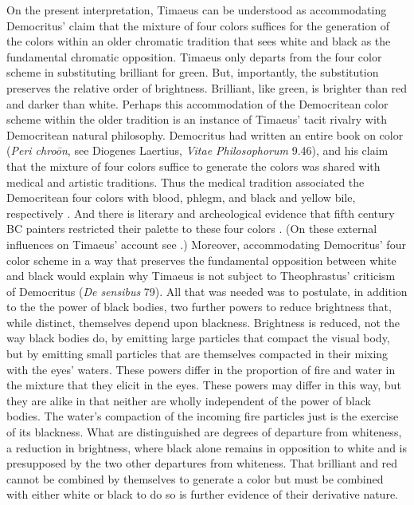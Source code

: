On the present interpretation, Timaeus can be understood as accommodating Democritus' claim that the mixture of four colors suffices for the generation of the colors within an older chromatic tradition that sees white and black as the fundamental chromatic opposition. Timaeus only departs from the four color scheme in substituting brilliant for green. But, importantly, the substitution preserves the relative order of brightness. Brilliant, like green, is brighter than red and darker than white. Perhaps this accommodation of the Democritean color scheme within the older tradition is an instance of Timaeus' tacit rivalry with Democritean natural philosophy. Democritus had written an entire book on color (\emph{Peri chroōn}, see Diogenes Laertius, \emph{Vitae Philosophorum} 9.46), and his claim that the mixture of four colors suffice to generate the colors was shared with medical and artistic traditions. Thus the medical tradition associated the Democritean four colors with blood, phlegm, and black and yellow bile, respectively \cite[]{Longrigg:1963tt}. And there is literary and archeological evidence that fifth century BC painters restricted their palette to these four colors \cite[56--7]{Bruno:1977fk}. (On these external influences on Timaeus' account see \citealt[127--8]{Ierodiakonou:2009cg}.) Moreover, accommodating Democritus' four color scheme in a way that preserves the fundamental opposition between white and black would explain why Timaeus is not subject to Theophrastus' criticism of Democritus (\emph{De sensibus} 79). All that was needed was to postulate, in addition to the the power of black bodies, two further powers to reduce brightness that, while distinct, themselves depend upon blackness. Brightness is reduced, not the way black bodies do, by emitting large particles that compact the visual body, but by emitting small particles that are themselves compacted in their mixing with the eyes' waters. These powers differ in the proportion of fire and water in the mixture that they elicit in the eyes. These powers may differ in this way, but they are alike in that neither are wholly independent of the power of black bodies. The water's compaction of the incoming fire particles just is the exercise of its blackness. What are distinguished are degrees of departure from whiteness, a reduction in brightness, where black alone remains in opposition to white and is presupposed by the two other departures from whiteness. That brilliant and red cannot be combined by themselves to generate a color but must be combined with either white or black to do so is further evidence of their derivative nature.

